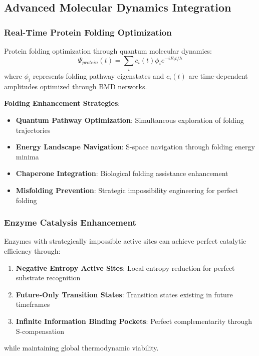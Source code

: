 ﻿\documentclass[11pt,a4paper]{article}
\begin{document}
\begin{itemize}
\begin{itemize}
\subsection{Advanced Molecular Dynamics Integration}

\subsubsection{Real-Time Protein Folding Optimization}

\begin{definition}
Protein folding optimization through quantum molecular dynamics:
\begin{equation}
\Psi_{protein}(t) = \sum_i c_i(t) \phi_i e^{-iE_i t/\hbar}
\end{equation}
where $\phi_i$ represents folding pathway eigenstates and $c_i(t)$ are time-dependent amplitudes optimized through BMD networks.
\end{definition}

\textbf{Folding Enhancement Strategies}:
\begin{itemize}
\item \textbf{Quantum Pathway Optimization}: Simultaneous exploration of folding trajectories
\item \textbf{Energy Landscape Navigation}: S-space navigation through folding energy minima
\item \textbf{Chaperone Integration}: Biological folding assistance enhancement
\item \textbf{Misfolding Prevention}: Strategic impossibility engineering for perfect folding
\end{itemize}

\subsubsection{Enzyme Catalysis Enhancement}

\begin{theorem}
Enzymes with strategically impossible active sites can achieve perfect catalytic efficiency through:
\begin{enumerate}
\item \textbf{Negative Entropy Active Sites}: Local entropy reduction for perfect substrate recognition
\item \textbf{Future-Only Transition States}: Transition states existing in future timeframes
\item \textbf{Infinite Information Binding Pockets}: Perfect complementarity through S-compensation
\end{enumerate}
while maintaining global thermodynamic viability.
\end{theorem}


\end{itemize}
\end{itemize}
\end{document}
